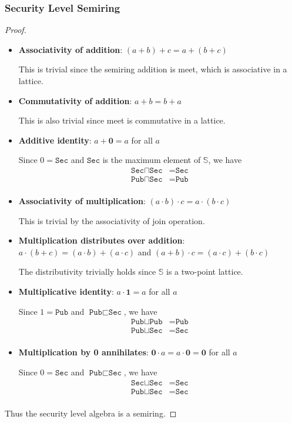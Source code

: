 \documentclass[conference]{IEEEtran}
\newcommand\public{\texttt{Pub}}
\newcommand\secret{\texttt{Sec}}
\newcommand\secure{\mathbb{S}}
\newcommand\srzero{\textbf{0}}
\newcommand\srone{\textbf{1}}
\begin{document}
\subsubsection{Security Level Semiring}
\begin{proof}\leavevmode
	\begin{itemize}
		\item \textbf{Associativity of addition}: $(a+b)+c=a+(b+c)$
		
		This is trivial since the semiring addition is meet, which is associative in a lattice.
		\item \textbf{Commutativity of addition}: $a+b=b+a$
		
		This is also trivial since meet is commutative in a lattice.
		\item \textbf{Additive identity}: $a+\srzero=a$ for all $a$
		
		Since $0=\secret$ and $\secret$ is the maximum element of $\secure$, we have
		\begin{equation}
			\begin{aligned}
				\secret\sqcap\secret&=\secret\\
				\public\sqcap\secret&=\public\\	
			\end{aligned}
		\end{equation}
		\item \textbf{Associativity of multiplication}: $(a\cdot b)\cdot c=a\cdot (b\cdot c)$
		
		This is trivial by the associativity of join operation.
		
		\item \textbf{Multiplication distributes over addition}: $a\cdot(b+c)=(a\cdot b)+(a\cdot c)$ and $(a+b)\cdot c=(a\cdot c)+(b\cdot c)$
		
		The distributivity trivially holds since $\secure$ is a two-point lattice.
		
		\item \textbf{Multiplicative identity}: $a\cdot\srone=a$ for all $a$
		
		Since $1=\public$ and $\public\sqsubset\secret$, we have
		\begin{equation}
			\begin{aligned}
				\public\sqcup\public&=\public\\
				\public\sqcup\secret&=\secret\\
			\end{aligned}
		\end{equation}
		\item \textbf{Multiplication by 0 annihilates}: $\srzero\cdot a=a\cdot\srzero=\srzero$ for all $a$
		
		Since $0=\secret$ and $\public\sqsubset\secret$, we have
		\begin{equation}
			\begin{aligned}
				\secret\sqcup\secret&=\secret\\
				\public\sqcup\secret&=\secret\\
			\end{aligned}
		\end{equation}
	\end{itemize}
	Thus the security level algebra is a semiring.
\end{proof}
\end{document}
